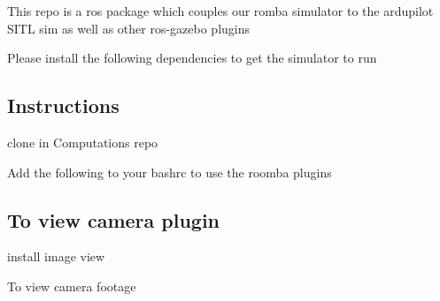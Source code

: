 This repo is a ros package which couples our romba simulator to the ardupilot S\+I\+TL sim as well as other ros-\/gazebo plugins

Please install the following dependencies to get the simulator to run


\begin{DoxyCode}{0}
\end{DoxyCode}


\subsection*{Instructions}

clone in Computations repo


\begin{DoxyCode}{0}
\end{DoxyCode}


Add the following to your bashrc to use the roomba plugins


\begin{DoxyCode}{0}
\end{DoxyCode}



\begin{DoxyCode}{0}
\end{DoxyCode}


\subsection*{To view camera plugin}

install image view


\begin{DoxyCode}{0}
\end{DoxyCode}


To view camera footage 
\begin{DoxyCode}{0}
\end{DoxyCode}
 
